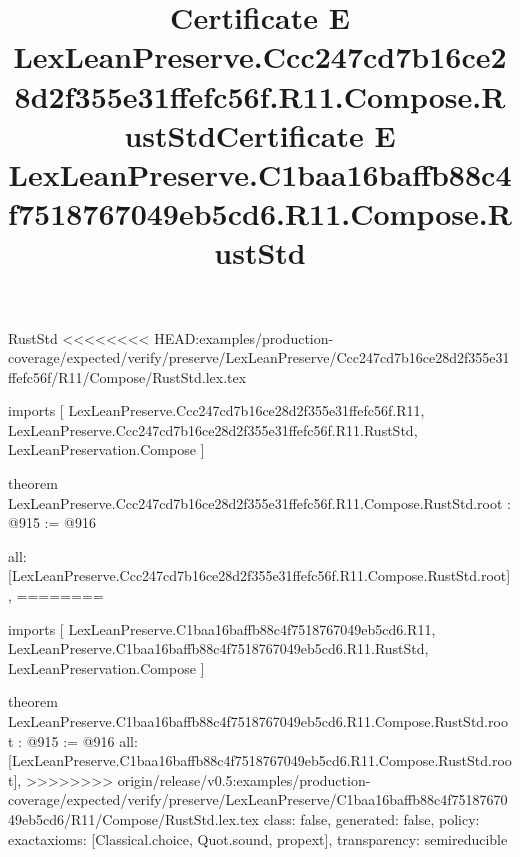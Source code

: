 \begin{lexlean}{RustStd}
<<<<<<<< HEAD:examples/production-coverage/expected/verify/preserve/LexLeanPreserve/Ccc247cd7b16ce28d2f355e31ffefc56f/R11/Compose/RustStd.lex.tex
\title{Certificate E LexLeanPreserve.Ccc247cd7b16ce28d2f355e31ffefc56f.R11.Compose.RustStd}
\begin{coremodule}
imports [
  LexLeanPreserve.Ccc247cd7b16ce28d2f355e31ffefc56f.R11,
  LexLeanPreserve.Ccc247cd7b16ce28d2f355e31ffefc56f.R11.RustStd,
  LexLeanPreservation.Compose
]

theorem LexLeanPreserve.Ccc247cd7b16ce28d2f355e31ffefc56f.R11.Compose.RustStd.root : @915 := @916 {
  all: [LexLeanPreserve.Ccc247cd7b16ce28d2f355e31ffefc56f.R11.Compose.RustStd.root],
========
\title{Certificate E LexLeanPreserve.C1baa16baffb88c4f7518767049eb5cd6.R11.Compose.RustStd}
\begin{coremodule}
imports [
  LexLeanPreserve.C1baa16baffb88c4f7518767049eb5cd6.R11,
  LexLeanPreserve.C1baa16baffb88c4f7518767049eb5cd6.R11.RustStd,
  LexLeanPreservation.Compose
]

theorem LexLeanPreserve.C1baa16baffb88c4f7518767049eb5cd6.R11.Compose.RustStd.root : @915 := @916 {
  all: [LexLeanPreserve.C1baa16baffb88c4f7518767049eb5cd6.R11.Compose.RustStd.root],
>>>>>>>> origin/release/v0.5:examples/production-coverage/expected/verify/preserve/LexLeanPreserve/C1baa16baffb88c4f7518767049eb5cd6/R11/Compose/RustStd.lex.tex
  class: false,
  generated: false,
  policy: exact{axioms: [Classical.choice, Quot.sound, propext]},
  transparency: semireducible
}


\end{coremodule}}
\end{coremodule}
\end{lexlean}
